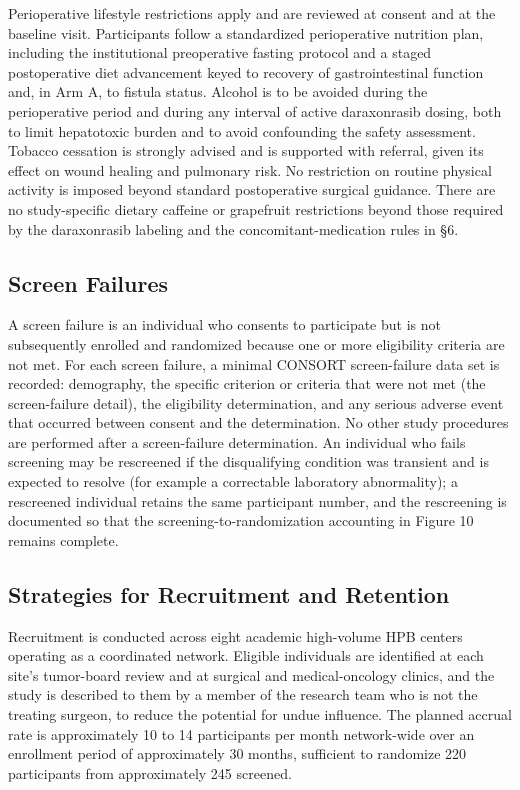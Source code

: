 Perioperative lifestyle restrictions apply and are reviewed at consent and at the
baseline visit. Participants follow a standardized perioperative nutrition plan,
including the institutional preoperative fasting protocol and a staged
postoperative diet advancement keyed to recovery of gastrointestinal function and,
in Arm A, to fistula status. Alcohol is to be avoided during the perioperative
period and during any interval of active daraxonrasib dosing, both to limit
hepatotoxic burden and to avoid confounding the safety assessment. Tobacco
cessation is strongly advised and is supported with referral, given its effect on
wound healing and pulmonary risk. No restriction on routine physical activity is
imposed beyond standard postoperative surgical guidance. There are no
study-specific dietary caffeine or grapefruit restrictions beyond those required by
the daraxonrasib labeling and the concomitant-medication rules in \S6.

\subsection{Screen Failures}

A screen failure is an individual who consents to participate but is not
subsequently enrolled and randomized because one or more eligibility criteria are
not met. For each screen failure, a minimal CONSORT screen-failure data set is
recorded: demography, the specific criterion or criteria that were not met (the
screen-failure detail), the eligibility determination, and any serious adverse
event that occurred between consent and the determination. No other study
procedures are performed after a screen-failure determination. An individual who
fails screening may be rescreened if the disqualifying condition was transient and
is expected to resolve (for example a correctable laboratory abnormality); a
rescreened individual retains the same participant number, and the rescreening is
documented so that the screening-to-randomization accounting in Figure 10 remains
complete.

\subsection{Strategies for Recruitment and Retention}

Recruitment is conducted across eight academic high-volume HPB centers operating as
a coordinated network. Eligible individuals are identified at each site's tumor-board
review and at surgical and medical-oncology clinics, and the study is described to
them by a member of the research team who is not the treating surgeon, to reduce the
potential for undue influence. The planned accrual rate is approximately 10 to 14
participants per month network-wide over an enrollment period of approximately 30
months, sufficient to randomize 220 participants from approximately 245 screened.

